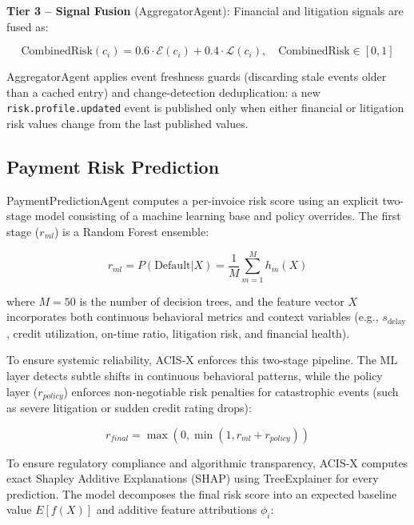 \documentclass[runningheads]{llncs}
\begin{document}
\textbf{Tier 3 -- Signal Fusion} (AggregatorAgent): Financial and litigation signals are fused as:

\begin{equation}
\text{CombinedRisk}(c_i) = 0.6\cdot\mathcal{E}(c_i) + 0.4\cdot\mathcal{L}(c_i), \quad \text{CombinedRisk}\in[0,1]
\label{eq:aggregation}
\end{equation}

AggregatorAgent applies event freshness guards (discarding stale events older than a cached entry) and change-detection deduplication: a new \texttt{risk.\allowbreak profile.\allowbreak updated} event is published only when either financial or litigation risk values change from the last published values.

\subsection{Payment Risk Prediction}

PaymentPredictionAgent computes a per-invoice risk score using an explicit two-stage model consisting of a machine learning base and policy overrides. The first stage ($r_{ml}$) is a Random Forest ensemble:

\begin{equation}
r_{ml} = P(\text{Default}|X) = \frac{1}{M} \sum_{m=1}^{M} h_m(X)
\label{eq:prediction}
\end{equation}

where $M=50$ is the number of decision trees, and the feature vector $X$ incorporates both continuous behavioral metrics and context variables (e.g., $s_{\text{delay}}$, credit utilization, on-time ratio, litigation risk, and financial health). 

To ensure systemic reliability, ACIS-X enforces this two-stage pipeline. The ML layer detects subtle shifts in continuous behavioral patterns, while the policy layer ($r_{policy}$) enforces non-negotiable risk penalties for catastrophic events (such as severe litigation or sudden credit rating drops):

\begin{equation}
r_{final} = \max(0, \min(1, r_{ml} + r_{policy}))
\label{eq:twostage}
\end{equation}

To ensure regulatory compliance and algorithmic transparency, ACIS-X computes exact Shapley Additive Explanations (SHAP) using TreeExplainer \cite{lundberg2020local} for every prediction. The model decomposes the final risk score into an expected baseline value $E[f(X)]$ and additive feature attributions $\phi_i$:
\end{document}
